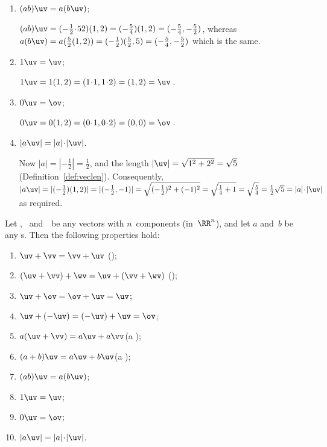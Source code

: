\begin{example}
\begin{enumerate}
\item \((ab)\uv=a(b\uv)\);
\begin{solution} 
\((ab)\uv=(-\tfrac12\cdot52)(1,2)=(-\tfrac54)(1,2) =(-\tfrac54,-\tfrac52)\), whereas \(a(b\uv)=a(\tfrac52(1,2)) =(-\tfrac12)(\tfrac52,5) =(-\tfrac54,-\tfrac52)\) which is the same.
\end{solution}

\item \(1\uv=\uv\);
\begin{solution} 
\(1\uv=1(1,2)=(1\cdot1,1\cdot2)=(1,2)=\uv\)\,. 
\end{solution}

\item \(0\uv=\ov\);
\begin{solution} 
\(0\uv=0(1,2)=(0\cdot1,0\cdot2)=(0,0)=\ov\)\,. 
\end{solution}

\item \(|a\uv|=|a|\cdot|\uv|\).
\begin{solution} 
Now \(|a|=|-\tfrac12|=\tfrac12\), and the length \(|\uv|=\sqrt{1^2+2^2}=\sqrt5\) (Definition~\ref{def:veclen}).
Consequently, \(|a\uv| =|(-\tfrac12)(1,2)| =|(-\tfrac12,-1)| =\sqrt{(-\tfrac12)^2+(-1)^2} =\sqrt{\tfrac14+1} =\sqrt{\tfrac54} =\tfrac12\sqrt5=|a|\cdot|\uv|\) as required.
\end{solution}

\end{enumerate}
\end{example}


\begin{theorem} \label{thm:vecops}
Let \uv, \vv\ and~\wv\ be any vectors with \(n\)~components (in~\(\RR^n\)), and let \(a\) and~\(b\) be any s.
Then the following properties hold:
\begin{enumerate}
\item\label{thm:vecopsa} \(\uv+\vv=\vv+\uv\) \quad();
\item\label{thm:vecopsb} \((\uv+\vv)+\wv=\uv+(\vv+\wv)\) \quad();
\item\label{thm:vecopsc} \(\uv+\ov=\ov+\uv=\uv\);
\item\label{thm:vecopsd} \(\uv+(-\uv)=(-\uv)+\uv=\ov\);
\item\label{thm:vecopse} \(a(\uv+\vv)=a\uv+a\vv\)\quad(a );
\item\label{thm:vecopsf} \((a+b)\uv=a\uv+b\uv\)\quad(a );
\item\label{thm:vecopsg} \((ab)\uv=a(b\uv)\);
\item\label{thm:vecopsh} \(1\uv=\uv\);
\item\label{thm:vecopsi} \(0\uv=\ov\);
\item\label{thm:vecopsj} \(|a\uv|=|a|\cdot|\uv|\).
\end{enumerate}
\end{theorem}

